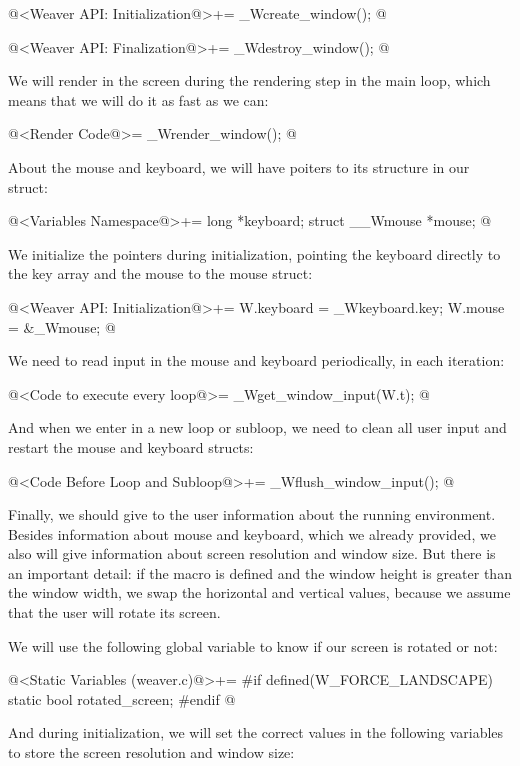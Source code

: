 \iniciocodigo
@<Weaver API: Initialization@>+=
_Wcreate_window();
@
\fimcodigo

\iniciocodigo
@<Weaver API: Finalization@>+=
_Wdestroy_window();
@
\fimcodigo

We will render in the screen during the rendering step in the main
loop, which means that we will do it as fast as we can:

\iniciocodigo
@<Render Code@>=
_Wrender_window();
@
\fimcodigo

About the mouse and keyboard, we will have poiters to its structure in
our  struct:

\iniciocodigo
@<Variables Namespace@>+=
long *keyboard;
struct __Wmouse *mouse;
@
\fimcodigo

We initialize the pointers during initialization, pointing the
keyboard directly to the key array and the mouse to the mouse struct:

\iniciocodigo
@<Weaver API: Initialization@>+=
W.keyboard = _Wkeyboard.key;
W.mouse = &_Wmouse;
@
\fimcodigo

We need to read input in the mouse and keyboard periodically, in each
iteration:

\iniciocodigo
@<Code to execute every loop@>=
_Wget_window_input(W.t);
@
\fimcodigo

And when we enter in a new loop or subloop, we need to clean all user
input and restart the mouse and keyboard structs:

\iniciocodigo
@<Code Before Loop and Subloop@>+=
_Wflush_window_input();
@
\fimcodigo

Finally, we should give to the user information about the running
environment. Besides information about mouse and keyboard, which we
already provided, we also will give information about screen
resolution and window size. But there is an important detail: if the
macro  is defined and the window
height is greater than the window width, we swap the horizontal and
vertical values, because we assume that the user will rotate its
screen.

We will use the following global variable to know if our screen is
rotated or not:

\iniciocodigo
@<Static Variables (weaver.c)@>+=
#if defined(W_FORCE_LANDSCAPE)
static bool rotated_screen;
#endif
@
\fimcodigo

And during initialization, we will set the correct values in the
following variables to store the screen resolution and window size:

